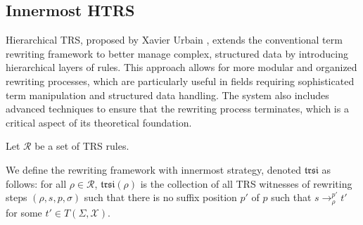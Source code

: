 
  \subsection{Innermost HTRS}
  Hierarchical TRS, proposed by Xavier Urbain \cite{urbain2001approche}, extends the conventional term rewriting framework to better manage complex, structured data by introducing hierarchical layers of rules. This approach allows for more modular and organized rewriting processes, which are particularly useful in fields requiring sophisticated term manipulation and structured data handling. The system also includes advanced techniques to ensure that the rewriting process terminates, which is a critical aspect of its theoretical foundation.
  
  
  \begin{definition}
    Let $\mathcal{R}$ be a set of TRS rules. 
  
    We define the rewriting framework with innermost strategy, denoted $\mathfrak{trsi}$ as follows: for all $\rho \mathop{\in} \mathcal{R}$, $\mathfrak{trsi}(\rho)$ is the collection of all TRS witnesses of rewriting steps $(\rho, s, p, \sigma)$ such that there is no suffix position $p'$ of $p$ such that $s \mathop{\to} _\rho^{p'} t'$ for some $t' \mathop{\in} T(\Sigma,\mathcal{X})$.
  \end{definition}
  
